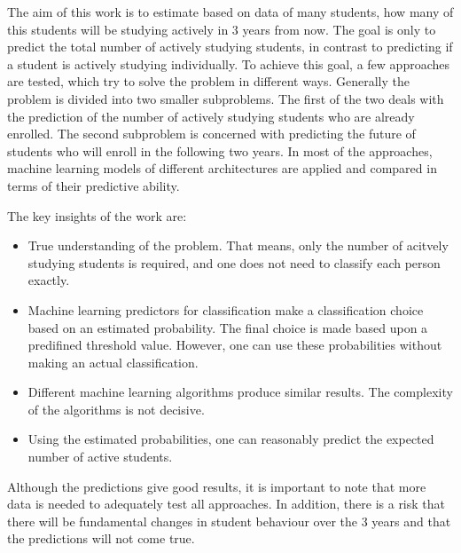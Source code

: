 
The aim of this work is to estimate based on data of many students, how many of this students will be studying
actively in 3 years from now. The goal is only to predict the total number of actively studying students,
in contrast to predicting if a student is actively studying individually.
To achieve this goal, a few approaches are tested, which try to solve the problem in different ways.
Generally the problem is divided into two smaller subproblems. The first of the two deals with the prediction of the number of
actively studying students who are already enrolled.
The second subproblem is concerned with predicting the future of students who will enroll in the following two years.
In most of the approaches, machine learning models of different architectures are applied and compared in terms of their predictive ability. 

The key insights of the work are:
\begin{itemize}
	\item True understanding of the problem. That means, only the number of acitvely studying students
	      is required, and one does not need to classify each person exactly.
	\item Machine learning predictors for classification make a classification choice based on an estimated probability.
	      The final choice is made based upon a predifined threshold value. However, one can use these probabilities without making an
	      actual classification.
	\item Different machine learning algorithms produce similar results. The complexity of the algorithms is not decisive.
	\item Using the estimated probabilities, one can reasonably predict the expected number of active students.
\end{itemize}

Although the predictions give good results, it is important to note that more data is needed to adequately test all approaches.
In addition, there is a risk that there will be fundamental changes in student behaviour over the 3 years and that the predictions
will not come true.


